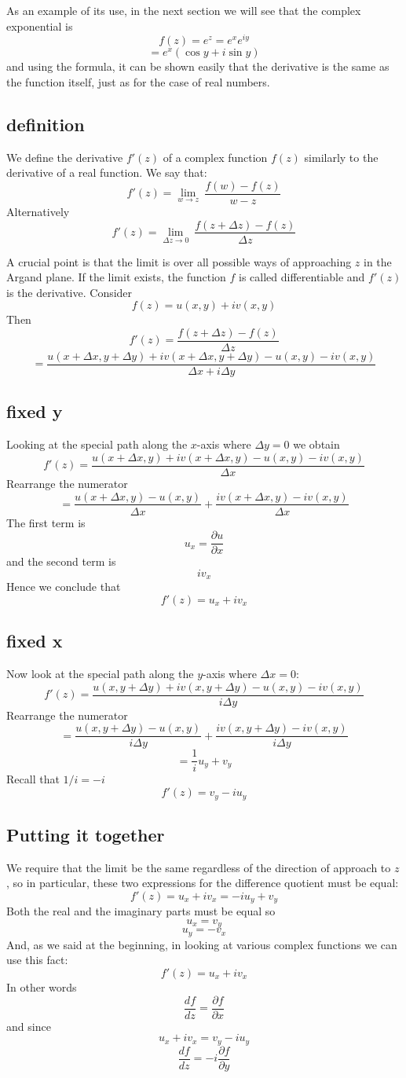 \documentclass[11pt, oneside]{article}   	%
\begin{document}
As an example of its use, in the next section we will see that the complex exponential is
\[ f(z) = e^z = e^x e^{iy} \]
\[ = e^x (\cos y + i \sin y) \]
and using the formula, it can be shown easily that the derivative is the same as the function itself, just as for the case of real numbers.

\subsection*{definition}
We define the derivative $f'(z)$ of a complex function $f(z)$ similarly to the derivative of a real function.  We say that:
\[ f'(z) = \lim_{w \rightarrow z} \ \frac{f(w) - f(z)}{w-z} \]
Alternatively
\[ f'(z) = \lim_{\Delta z \rightarrow 0} \ \frac{f(z + \Delta z) - f(z)}{\Delta z} \]

A crucial point is that the limit is over all possible ways of approaching $z$ in the Argand plane.  If the limit exists, the function $f$ is called differentiable and $f'(z)$ is the derivative.
Consider
\[ f(z) = u(x,y) + i v(x,y) \]
Then
\[ f'(z) = \frac{f(z + \Delta z) - f(z)}{\Delta z} \]
\[ = \frac{u(x + \Delta x, y + \Delta y) + i v (x + \Delta x, y + \Delta y) - u(x,y) - i v(x,y)}{\Delta x + i \Delta y} \]

\subsection*{fixed y}
Looking at the special path along the $x$-axis where $\Delta y = 0$ we obtain
\[ f'(z) = \frac{u(x + \Delta x, y) + i v (x + \Delta x, y) - u(x,y) - i v(x,y)}{\Delta x} \]
Rearrange the numerator
\[ = \frac{u(x + \Delta x, y) - u(x,y)}{\Delta x} + \frac{i v (x + \Delta x, y) - i v(x,y)}{\Delta x} \]
The first term is
\[ u_x = \frac{\partial u}{\partial x} \]
and the second term is 
\[ i v_x \]
Hence we conclude that
\[ f'(z) = u_x + i v_x \]

\subsection*{fixed x}
Now look at the special path along the $y$-axis where $\Delta x = 0$:
\[ f'(z) = \frac{u(x, y + \Delta y) + i v (x, y + \Delta y) - u(x,y) - i v(x,y)}{i \Delta y} \]
Rearrange the numerator
\[ = \frac{u(x, y + \Delta y) - u(x,y)}{i \Delta y} + \frac{i v (x, y + \Delta y) - i v(x,y)}{i \Delta y} \]
\[ = \frac{1}{i} u_y + v_y \]
Recall that $1/i = -i$
\[ f'(z) = v_y - i u_y \]

\subsection*{Putting it together}
We require that the limit be the same regardless of the direction of approach to $z$, so in particular, these two expressions for the difference quotient must be equal:
\[ f'(z) = u_x + i v_x = - i u_y + v_y \]
Both the real and the imaginary parts must be equal so
\[ u_x  = v_y \]
\[ u_y = - v_x \]
And, as we said at the beginning, in looking at various complex functions we can use this fact:
\[ f'(z) = u_x + i v_x \]
In other words
\[ \frac{df}{dz} = \frac{\partial f}{\partial x} \]
and since
\[ u_x + i v_x = v_y - i u_y \]
\[ \frac{df}{dz} = -i \frac{\partial f}{\partial y} \]
\end{document}
